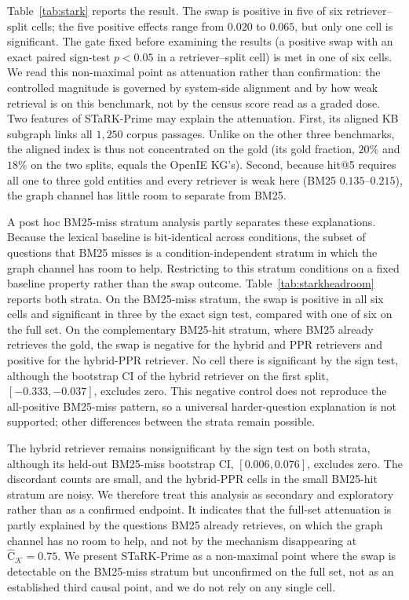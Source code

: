\documentclass[11pt]{article}
\newcommand{\Chat}{\widehat{\mathrm{C}}}
\newcommand{\kg}{\mathcal{K}}
\begin{document}
Table~\ref{tab:stark} reports the result. The swap is positive in five of six retriever--split cells; the five positive effects range from $0.020$ to $0.065$, but only one cell is significant. The gate fixed before examining the results (a positive swap with an exact paired sign-test $p<0.05$ in a retriever--split cell) is met in one of six cells. We read this non-maximal point as attenuation rather than confirmation: the controlled magnitude is governed by system-side alignment and by how weak retrieval is on this benchmark, not by the census score read as a graded dose. Two features of STaRK-Prime may explain the attenuation. First, its aligned KB subgraph links all $1{,}250$ corpus passages. Unlike on the other three benchmarks, the aligned index is thus not concentrated on the gold (its gold fraction, $20\%$ and $18\%$ on the two splits, equals the OpenIE KG's). Second, because hit@5 requires all one to three gold entities and every retriever is weak here (BM25 $0.135$--$0.215$), the graph channel has little room to separate from BM25.

A post hoc BM25-miss stratum analysis partly separates these explanations. Because the lexical baseline is bit-identical across conditions, the subset of questions that BM25 misses is a condition-independent stratum in which the graph channel has room to help. Restricting to this stratum conditions on a fixed baseline property rather than the swap outcome. Table~\ref{tab:starkheadroom} reports both strata. On the BM25-miss stratum, the swap is positive in all six cells and significant in three by the exact sign test, compared with one of six on the full set. On the complementary BM25-hit stratum, where BM25 already retrieves the gold, the swap is negative for the hybrid and PPR retrievers and positive for the hybrid-PPR retriever. No cell there is significant by the sign test, although the bootstrap CI of the hybrid retriever on the first split, $[-0.333,-0.037]$, excludes zero. This negative control does not reproduce the all-positive BM25-miss pattern, so a universal harder-question explanation is not supported; other differences between the strata remain possible.

The hybrid retriever remains nonsignificant by the sign test on both strata, although its held-out BM25-miss bootstrap CI, $[0.006,0.076]$, excludes zero. The discordant counts are small, and the hybrid-PPR cells in the small BM25-hit stratum are noisy. We therefore treat this analysis as secondary and exploratory rather than as a confirmed endpoint. It indicates that the full-set attenuation is partly explained by the questions BM25 already retrieves, on which the graph channel has no room to help, and not by the mechanism disappearing at \mbox{$\Chat_{\kg}=0.75$}. We present STaRK-Prime as a non-maximal point where the swap is detectable on the BM25-miss stratum but unconfirmed on the full set, not as an established third causal point, and we do not rely on any single cell.
\end{document}
